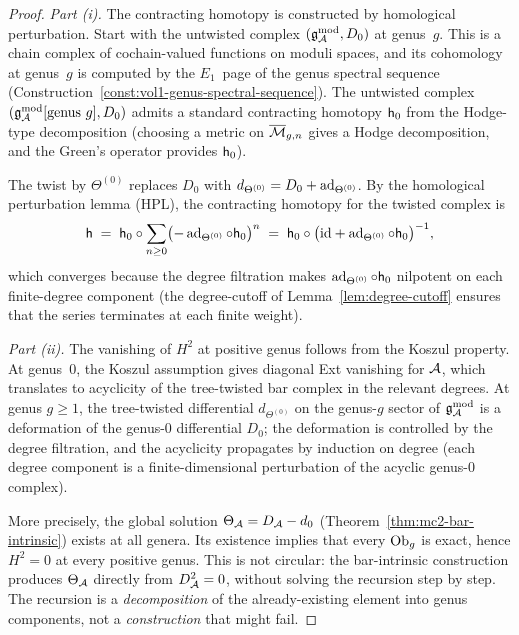 \begin{proof}
\emph{Part (i).} The contracting homotopy is constructed by
homological perturbation. Start with the untwisted complex
$(\mathfrak{g}_{\mathcal{A}}^{\mathrm{mod}}, D_0)$ at genus~$g$. This is a chain complex of
cochain-valued functions on moduli spaces, and its cohomology
at genus~$g$ is computed by the $E_1$~page of the genus
spectral sequence
(Construction~\ref{const:vol1-genus-spectral-sequence}).
The untwisted complex $(\mathfrak{g}_{\mathcal{A}}^{\mathrm{mod}}[\text{genus }g], D_0)$
admits a standard contracting homotopy $\mathsf{h}_0$ from the
Hodge-type decomposition (choosing a metric on $\overline{\mathcal{M}}_{g,n}$
gives a Hodge decomposition, and the Green's operator provides
$\mathsf{h}_0$).

The twist by $\Theta^{(0)}$ replaces $D_0$ with $d_{\Theta^{(0)}}
= D_0 + \operatorname{ad}_{\Theta^{(0)}}$. By the homological perturbation
lemma (HPL), the contracting homotopy for the twisted complex is
\begin{equation}\label{eq:thqg-VII-hpl-homotopy}
\mathsf{h}
\;=\;
\mathsf{h}_0 \circ
\sum_{n \geq 0}
\bigl(-\operatorname{ad}_{\Theta^{(0)}} \circ \mathsf{h}_0\bigr)^n
\;=\;
\mathsf{h}_0 \circ
\bigl(\mathrm{id} + \operatorname{ad}_{\Theta^{(0)}} \circ \mathsf{h}_0\bigr)^{-1},
\end{equation}
which converges because the degree filtration makes
$\operatorname{ad}_{\Theta^{(0)}} \circ \mathsf{h}_0$ nilpotent on each
finite-degree component (the degree-cutoff of
Lemma~\ref{lem:degree-cutoff} ensures that the series terminates
at each finite weight).

\medskip\noindent
\emph{Part (ii).} The vanishing of $H^2$ at positive genus
follows from the Koszul property. At genus~$0$, the Koszul
assumption gives diagonal Ext vanishing for $\mathcal{A}$, which
translates to acyclicity of the tree-twisted bar complex in
the relevant degrees. At genus $g \geq 1$, the tree-twisted
differential $d_{\Theta^{(0)}}$ on the genus-$g$ sector of
$\mathfrak{g}_{\mathcal{A}}^{\mathrm{mod}}$ is a deformation of the genus-$0$ differential
$D_0$; the deformation is controlled by the degree filtration,
and the acyclicity propagates by induction on degree
(each degree component is a finite-dimensional perturbation
of the acyclic genus-$0$ complex).

More precisely, the global solution $\Theta_{\mathcal{A}} = D_{\mathcal{A}} - d_0$
(Theorem~\ref{thm:mc2-bar-intrinsic}) exists at all genera.
Its existence implies that every $\mathrm{Ob}_g$ is exact, hence
$H^2 = 0$ at every positive genus. This is not circular: the
bar-intrinsic construction produces $\Theta_{\mathcal{A}}$ directly
from $D_{\mathcal{A}}^2 = 0$, without solving the recursion step by step.
The recursion is a \emph{decomposition} of the already-existing
element into genus components, not a \emph{construction} that
might fail.
\end{proof}

